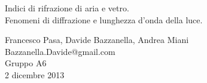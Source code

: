 \begin{center}

     	{\huge Indici di rifrazione di aria e vetro. \\}
     	\vspace{0.2cm}
     	{\huge Fenomeni di diffrazione e lunghezza d'onda della luce.}
	\vspace{0.3cm}

      	{\large Francesco Pasa, Davide Bazzanella, Andrea Miani} \\
      	{Bazzanella.Davide@gmail.com} \\
		{\large Gruppo A6} \\
	
	\vspace{0.1cm}
      	{\large 2 dicembre 2013}

\end{center}
